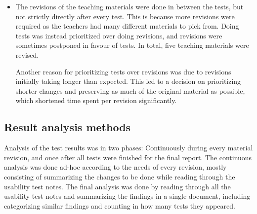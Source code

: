 \begin{itemize}
\item The revisions of the teaching materials were done in between the tests, but not strictly directly after every test. This is because more revisions were required as the teachers had many different materials to pick from. Doing tests was instead prioritized over doing revisions, and revisions were sometimes postponed in favour of tests. In total, five teaching materials were revised.

Another reason for prioritizing tests over revisions was due to revisions initially taking longer than expected. This led to a decision on prioritizing shorter changes and preserving as much of the original material as possible, which shortened time spent per revision significantly.

\end{itemize}



\subsection{Result analysis methods}
Analysis of the test results was in two phases: Continuously during every material revision, and once after all tests were finished for the final report. The continuous analysis was done ad-hoc according to the needs of every revision, mostly consisting of summarizing the changes to be done while reading through the usability test notes. The final analysis was done by reading through all the usability test notes and summarizing the findings in a single document, including categorizing similar findings and counting in how many tests they appeared.
  
